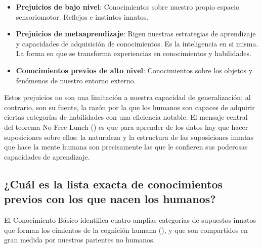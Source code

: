 \begin{itemize}
    \item \textbf{Prejuicios de bajo nivel}: Conocimientos sobre nuestro propio espacio sensoriomotor. Reflejos e instintos innatos.
    \item \textbf{Prejuicios de metaaprendizaje}: Rigen nuestras estrategias de aprendizaje y capacidades de adquisición de conocimientos. Es la inteligencia en si misma. La forma en que se transforma experiencias en conocimientos y habilidades.
    \item \textbf{Conocimientos previos de alto nivel}: Conocimientos sobre los objetos y fenómenos de nuestro entorno externo.
\end{itemize}

Estos prejuicios no son una limitación a nuestra capacidad de generalización; al contrario, son su fuente, la razón por la que los humanos son capaces de adquirir ciertas categorías de habilidades con una eficiencia notable. El mensaje central del teorema No Free Lunch (\cite{wolpert1997no}) es que para aprender de los datos hay que hacer suposiciones sobre ellos: la naturaleza y la estructura de las suposiciones innatas que hace la mente humana son precisamente las que le confieren sus poderosas capacidades de aprendizaje. 

\subsection{¿Cuál es la lista exacta de conocimientos previos con los que nacen los humanos?}

El Conocimiento Básico identifica cuatro amplias categorías de supuestos innatos que forman los cimientos de la cognición humana  (\cite{spelke2007core}), y que son compartidos en gran medida por nuestros parientes no humanos.

